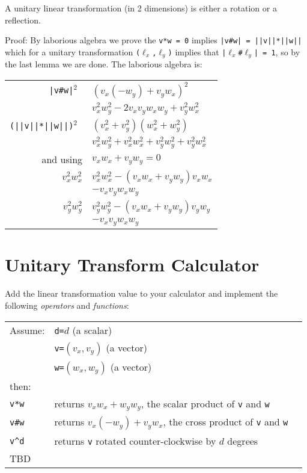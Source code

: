 \documentclass[12pt]{article}
\begin{document}
\begin{lemma}
A unitary linear transformation (in 2 dimensions)
is either a rotation or a reflection.
\end{lemma}
\begin{indpar}{0.5in}
Proof: By laborious algebra we prove the {\tt v*w = 0} implies
{\tt |v\#w| = ||v||*||w||} which for a unitary transformation
{\tt ($\ell_x$,$\ell_y$)} implies that {\tt |$\ell_x$\#$\ell_y$| = 1},
so by the last lemma we are done.  The laborious algebra is:
\begin{center}
\begin{tabular}{r@{~=~}l}
\tt |v\#w|$^2$ & $(v_x(-w_y)+v_y w_x)^2$ \\
               & $v_x^2 w_y^2 - 2 v_x v_y w_x w_y + v_y^2 w_x^2$ \\
\tt (||v||*||w||)$^2$
               & $(v_x^2+v_y^2)(w_x^2+w_y^2)$ \\
               & $v_x^2 w_y^2 + v_x^2 w_x^2 + v_y^2 w_y^2 + v_y^2 w_x^2$ \\
and using      & $v_x w_x + v_y w_y = 0$ \\
$v_x^2 w_x^2$  & $v_x^2 w_x^2 - (v_x w_x + v_y w_y)v_x w_x$ \\
	       & $-v_x v_y w_x w_y$ \\
$v_y^2 w_y^2$  & $v_y^2 w_y^2 - (v_x w_x + v_y w_y)v_y w_y$ \\
	       & $-v_x v_y w_x w_y$ \\
\end{tabular}
\end{center}
\end{indpar}

\section{Unitary Transform Calculator}
Add the linear transformation value to your calculator and implement
the following {\em operators} and {\em functions}:
\begin{center}
\begin{tabular}{l@{~~~~~}l@{~~~~~}l}
Assume: & {\tt d=}$d$ (a scalar) \\
	& {\tt v=}$(v_x,v_y)$ (a vector) \\
	& {\tt w=}$(w_x,w_y)$ (a vector) \\
then: \\[1ex]
\tt v*w & returns $v_x w_x + w_y w_y$,
          the scalar product of {\tt v} and {\tt w} \\
\tt v\#w & returns $v_x(-w_y)+v_y w_x$,
           the cross product of {\tt v} and {\tt w} \\
\tt v\textasciicircum d & returns {\tt v} rotated counter-clockwise by
			  $d$ degrees \\

TBD
\end{tabular}
\end{center}
\end{document}
